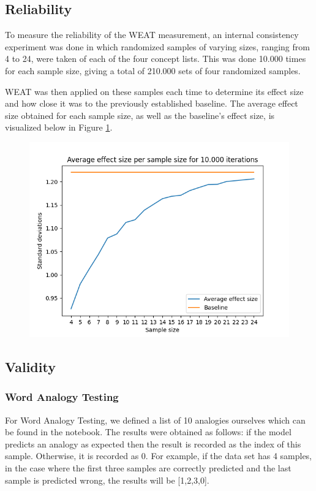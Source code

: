 \documentclass[11pt]{article}
\begin{document}
\subsection{Reliability}
To measure the reliability of the WEAT measurement, an internal consistency experiment was done in which randomized samples of varying sizes, ranging from 4 to 24, were taken of each of the four concept lists. This was done 10.000 times for each sample size, giving a total of 210.000 sets of four randomized samples. 

WEAT was then applied on these samples each time to determine its effect size and how close it was to the previously established baseline. The average effect size obtained for each sample size, as well as the baseline's effect size, is visualized below in Figure \ref{fig:avg effect sizes}.

\begin{figure}[htbp]
    \centering
    \includegraphics[scale=0.52]{figures/avg_effect_sizes.png}
    \caption{}
    \label{fig:avg effect sizes}
\end{figure}

\subsection{Validity}
\subsubsection{Word Analogy Testing}
For Word Analogy Testing, we defined a list of 10 analogies ourselves which can be found in the notebook. The results were obtained as follows: if the model predicts an analogy as expected then the result is recorded as the index of this sample. Otherwise, it is recorded as 0. For example, if the data set has 4 samples, in the case where the first three samples are correctly predicted and the last sample is predicted wrong, the results will be [1,2,3,0].
\end{document}
